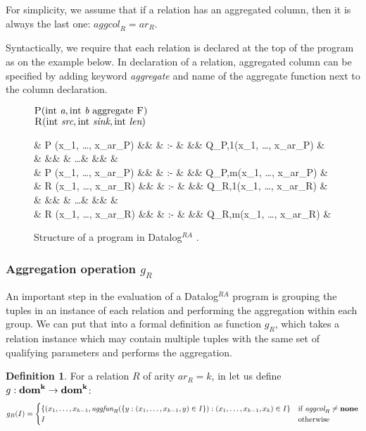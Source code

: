 \documentclass{pracamgr}
\theoremstyle{plain}
\theoremstyle{definition}
\newtheorem{defn}{Definition}[section]
\theoremstyle{remark}
\newcommand{\datalogra}{Datalog$^{RA}$ }
\newcommand{\aggfun}{\textit{aggfun} }
\newcommand{\aggcol}{\textit{aggcol} }
\newcommand{\narrow}[1]{\begin{changemargin}{2cm}{2cm} #1 \end{changemargin}}
\begin{document}
For simplicity, we assume that if a relation has an aggregated column, then it is always the last one: $\aggcol_R = ar_R$.

Syntactically, we require that each relation is declared at the top of the program as on the example below. In declaration of a relation, aggregated column can be specified by adding keyword \textit{aggregate} and name of the aggregate function next to the column declaration.

\begin{figure}[h!]
\narrow{
  $\textsc{P}(\text{int } \textit{a}, \text{int } \textit{b} \text{ aggregate } \textsc{F}) $\\
  $\textsc{R}(\text{int } \textit{src}, \text{int } \textit{sink}, \text{int } \textit{len}) $ 
  \begin{flalign*}
  & \textsc{P} (x_1, \dots, x_{ar_P}) &&  & :- & && Q_{P,1}(x_1, \dots, x_{ar_P}) & \\
  &  &&  & \dots & && & \\
  & \textsc{P} (x_1, \dots, x_{ar_P}) &&  & :- & && Q_{P,m}(x_1, \dots, x_{ar_P}) & \\
  & \textsc{R} (x_1, \dots, x_{ar_R}) &&  & :- & && Q_{R,1}(x_1, \dots, x_{ar_R}) & \\
  &  &&  & \dots & && & \\
  & \textsc{R} (x_1, \dots, x_{ar_R}) &&  & :- & && Q_{R,m}(x_1, \dots, x_{ar_R}) & \\
  \end{flalign*}
  \caption{Structure of a program in \datalogra.}
}
\end{figure}

\subsubsection{Aggregation operation $g_R$}
An important step in the evaluation of a \datalogra program is grouping the tuples in an instance of each relation and performing the aggregation within each group. We can put that into a formal definition as function $g_R$, which takes a relation instance which may contain multiple tuples with the same set of qualifying parameters and performs the aggregation.
\begin{defn}\label{d:aggregationoperationgr}
For a relation $R$ of arity $ar_R = k$, in let us define $g: \bf{dom}^k \to \bf{dom}^k$:
$$
g_R(I) = \begin{cases}
\{(x_1, \dots, x_{k-1}, \aggfun_R(\{y: (x_1, \dots, x_{k-1}, y) \in I\}): (x_1, \dots, x_{k-1}, x_k) \in I\} & \text{if } \aggcol_R \ne \bf{none} \\
I & \text{otherwise}
\end{cases}
$$
\end{defn}
\end{document}
